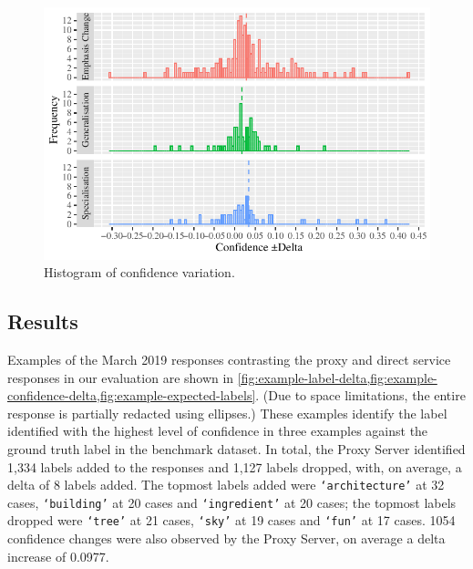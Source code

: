 \begin{figure}[t]
    \centering
    \includegraphics[width=\linewidth]{frequency}
    \caption[Histogram of confidence variation]{Histogram of confidence variation.}
    \label{fig:frequency}
\end{figure}

\subsection{Results}

Examples of the March 2019 responses contrasting the proxy and direct service responses in our evaluation are shown in \cref{fig:example-label-delta,fig:example-confidence-delta,fig:example-expected-labels}. (Due to space limitations, the entire  response is partially redacted using ellipses.) These examples identify the label identified with the highest level of confidence in three examples against the ground truth label in the benchmark dataset. In total, the Proxy Server identified 1,334 labels added to the responses and 1,127 labels dropped, with, on average, a delta of 8 labels added. The topmost labels added were \texttt{`architecture'} at 32 cases, \texttt{`building'} at 20 cases and \texttt{`ingredient'} at 20 cases; the topmost labels dropped were \texttt{`tree'} at 21 cases, \texttt{`sky'} at 19 cases and \texttt{`fun'} at 17 cases. 1054 confidence changes were also observed by the Proxy Server, on average a delta increase of 0.0977. 

